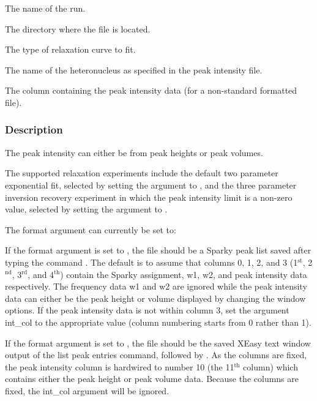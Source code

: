   The name of the run.

  The directory where the file is located.

  The type of relaxation curve to fit.

  The name of the heteronucleus as specified in the peak intensity file.

  The column containing the peak intensity data (for a non-standard formatted file).

\subsubsection{Description}

The peak intensity can either be from peak heights or peak volumes.


The supported relaxation experiments include the default two parameter exponential fit,
selected by setting the 
 argument to 
, and the three parameter inversion
recovery experiment in which the peak intensity limit is a non-zero value, selected by
setting the argument to 
.


The format argument can currently be set to:
    

    


If the format argument is set to 
, the file should be a Sparky peak list saved after
typing the command 
.  The default is to assume that columns 0, 1, 2, and 3 (1$^\mathrm{st}$, 2$^\mathrm{nd}$,
3$^\mathrm{rd}$, and 4$^\mathrm{th}$) contain the Sparky assignment, w1, w2, and peak intensity data respectively.
The frequency data w1 and w2 are ignored while the peak intensity data can either be the
peak height or volume displayed by changing the window options.  If the peak intensity data
is not within column 3, set the argument int\_col to the appropriate value (column numbering
starts from 0 rather than 1).

If the format argument is set to 
, the file should be the saved XEasy text window
output of the list peak entries command, 
 followed by 
.  As the columns are fixed,
the peak intensity column is hardwired to number 10 (the 11$^\mathrm{th}$ column) which contains either
the peak height or peak volume data.  Because the columns are fixed, the int\_col argument
will be ignored.


